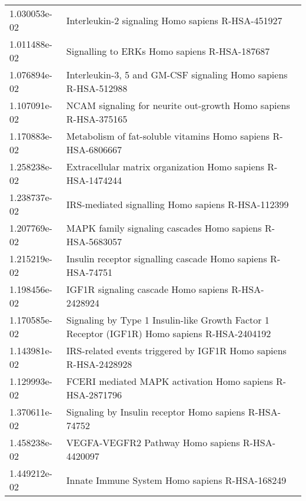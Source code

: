 \begin{longtable}{p{2.4cm}p{14.5cm}}
             1.030053e-02 &                                             Interleukin-2 signaling Homo sapiens R-HSA-451927 \\
             1.011488e-02 &                                                  Signalling to ERKs Homo sapiens R-HSA-187687 \\
             1.076894e-02 &                               Interleukin-3, 5 and GM-CSF signaling Homo sapiens R-HSA-512988 \\
             1.107091e-02 &                               NCAM signaling for neurite out-growth Homo sapiens R-HSA-375165 \\
             1.170883e-02 &                                 Metabolism of fat-soluble vitamins Homo sapiens R-HSA-6806667 \\
             1.258238e-02 &                                  Extracellular matrix organization Homo sapiens R-HSA-1474244 \\
             1.238737e-02 &                                             IRS-mediated signalling Homo sapiens R-HSA-112399 \\
             1.207769e-02 &                                     MAPK family signaling cascades Homo sapiens R-HSA-5683057 \\
             1.215219e-02 &                                  Insulin receptor signalling cascade Homo sapiens R-HSA-74751 \\
             1.198456e-02 &                                            IGF1R signaling cascade Homo sapiens R-HSA-2428924 \\
             1.170585e-02 &  Signaling by Type 1 Insulin-like Growth Factor 1 Receptor (IGF1R) Homo sapiens R-HSA-2404192 \\
             1.143981e-02 &                              IRS-related events triggered by IGF1R Homo sapiens R-HSA-2428928 \\
             1.129993e-02 &                                     FCERI mediated MAPK activation Homo sapiens R-HSA-2871796 \\
             1.370611e-02 &                                        Signaling by Insulin receptor Homo sapiens R-HSA-74752 \\
             1.458238e-02 &                                               VEGFA-VEGFR2 Pathway Homo sapiens R-HSA-4420097 \\
             1.449212e-02 &                                                Innate Immune System Homo sapiens R-HSA-168249 \\

\end{longtable}
